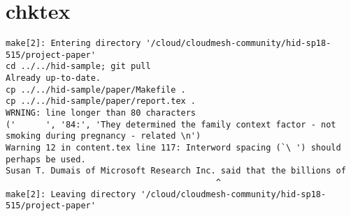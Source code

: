 \appendix
\section{chktex}
\begin{tiny}
\begin{verbatim}
make[2]: Entering directory '/cloud/cloudmesh-community/hid-sp18-515/project-paper'
cd ../../hid-sample; git pull
Already up-to-date.
cp ../../hid-sample/paper/Makefile .
cp ../../hid-sample/paper/report.tex .
WRNING: line longer than 80 characters
('      ', '84:', 'They determined the family context factor - not smoking during pregnancy - related \n')
Warning 12 in content.tex line 117: Interword spacing (`\ ') should perhaps be used.
Susan T. Dumais of Microsoft Research Inc. said that the billions of   
                                          ^
make[2]: Leaving directory '/cloud/cloudmesh-community/hid-sp18-515/project-paper'
\end{verbatim}
\end{tiny}
